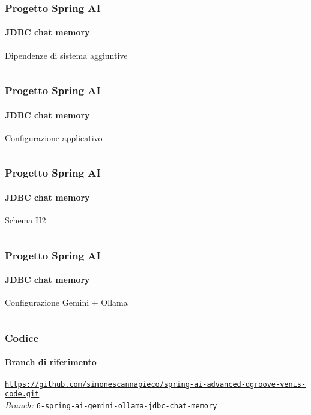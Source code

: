%
\begin{frame}[t,fragile] \frametitle{Progetto Spring AI}
    \framesubtitle{JDBC chat memory}
        \begin{block}{Dipendenze di sistema aggiuntive}
			{\tiny\inputminted{xml}{code/pom-3.xml}}
    	\end{block}
\end{frame}
%
\begin{frame}[t,fragile] \frametitle{Progetto Spring AI}
    \framesubtitle{JDBC chat memory}
        \begin{block}{Configurazione applicativo}
			{\tiny\inputminted{yaml}{code/application-2.yml}}
    	\end{block}
\end{frame}
%
\begin{frame}[t,fragile] \frametitle{Progetto Spring AI}
    \framesubtitle{JDBC chat memory}
        \begin{block}{Schema H2}
			{\tiny\inputminted{sql}{code/schema-h2.sql}}
    	\end{block}
\end{frame}
%
\begin{frame}[t,fragile] \frametitle{Progetto Spring AI}
    \framesubtitle{JDBC chat memory}
    	\vspace*{-.7cm}
        \begin{block}{Configurazione Gemini + Ollama}
			{\tiny\inputminted{java}{code/MemoryChatClientConfig.java}}
    	\end{block}
\end{frame}
%
\begin{frame}[fragile] \frametitle{Codice}
    \framesubtitle{Branch di riferimento}
	\begin{center}
		{\scriptsize \href{https://github.com/simonescannapieco/spring-ai-advanced-dgroove-venis-code.git}{\texttt{https://github.com/simonescannapieco/spring-ai-advanced-dgroove-venis-code.git}}}\\
		\textit{Branch:} \alert{\texttt{6-spring-ai-gemini-ollama-jdbc-chat-memory}}
	\end{center}
\end{frame}